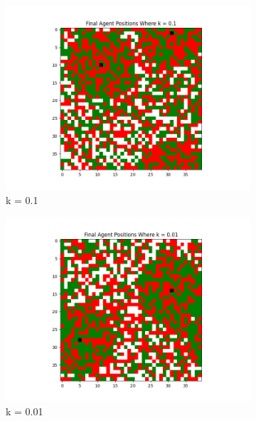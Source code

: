 \documentclass[11pt]{article}
\begin{document}
\begin{figure}[h]
\begin{subfigure}{0.2\textwidth}
			\includegraphics[width=\linewidth]{policy3_Final_01.png}
			\caption{\centering k = 0.1}
		\end{subfigure}\hfill
		\begin{subfigure}{0.2\textwidth}
			\includegraphics[width=\linewidth]{policy3_Final_001.png}
			\caption{\centering k = 0.01}
		\end{subfigure}\hfill
		\begin{subfigure}{0.2\textwidth}

\end{subfigure}
\end{figure}
\end{document}
